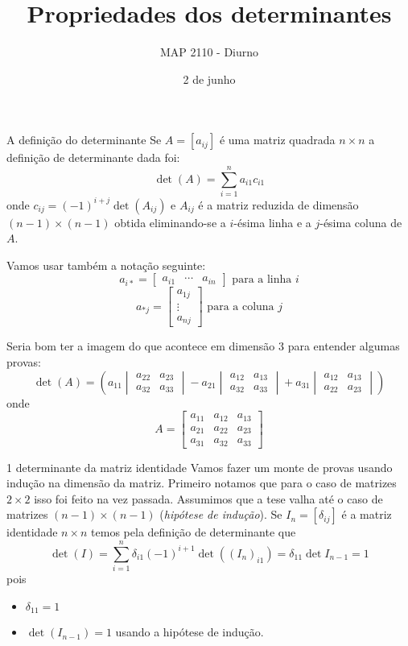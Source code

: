 \documentclass{beamer}
\title[Determinantes]{Propriedades dos determinantes}
\author{MAP 2110 - Diurno}
\institute{IME USP}
\date{2 de junho}
\begin{document}
\begin{frame}
  \titlepage
\end{frame}

\begin{frame}{A definição do determinante}
  Se $A=[a_{ij}]$ é uma matriz quadrada $n\times n$ a definição de determinante dada foi:
  $$ \det(A) = \sum_{i=1}^n a_{i1}c_{i1}$$
  onde $c_{ij} = (-1)^{i+j}\det(A_{ij})$ e $A_{ij}$ é a matriz reduzida de dimensão $(n-1)\times(n-1)$ obtida 
  eliminando-se a $i$-ésima linha e a $j$-ésima coluna de $A$.

  Vamos usar também a notação seguinte:
  $$ a_{i*} = \begin{bmatrix}
    a_{i1} & \cdots & a_{in}
  \end{bmatrix} \text{ para a linha }i$$
  $$ a_{*j}=\begin{bmatrix}
    a_{1j} \\ \vdots \\ a_{nj}
  \end{bmatrix} \text{ para a coluna } j $$
\end{frame}

\begin{frame}{}
  Seria bom ter a imagem do que acontece em dimensão 3
  para entender algumas provas:
  $$ \det(A) = \left( a_{11}
  \begin{vmatrix}
   a_{22} & a_{23} \\
   a_{32} & a_{33}
 \end{vmatrix} -
  a_{21}
  \begin{vmatrix}
   a_{12} & a_{13} \\
   a_{32} & a_{33}
 \end{vmatrix} + a_{31}
 \begin{vmatrix}
   a_{12} & a_{13}\\
   a_{22} & a_{23}
 \end{vmatrix} \right)$$
 onde 
 $$ A = \begin{bmatrix}
  a_{11} & a_{12} & a_{13} \\
  a_{21} & a_{22} & a_{23} \\
  a_{31} & a_{32} & a_{33} 
   \end{bmatrix}$$
\end{frame}

\begin{frame}{1 determinante da matriz identidade}
  Vamos fazer um monte de provas usando indução na dimensão da matriz.
  Primeiro notamos que para o caso de matrizes $2\times 2$ isso foi feito na vez passada.
  Assumimos que a tese valha até o caso de matrizes $(n-1)\times (n-1)$ (\textit{hipótese de indução}).
  Se $I_n =[\delta_{ij}]$ é a matriz identidade $n\times n$ temos pela definição de determinante que
  $$ \det(I) = \sum_{i=1}^n \delta_{i1} (-1)^{i+1}\det((I_n)_{i1}) = \delta_{11}\det{I_{n-1}} = 1$$
 pois 
 \begin{itemize}
   \item $\delta_{11}=1$
   \item $\det(I_{n-1})=1$ usando a hipótese de indução.
 \end{itemize}
 
\end{frame}
\end{document}
